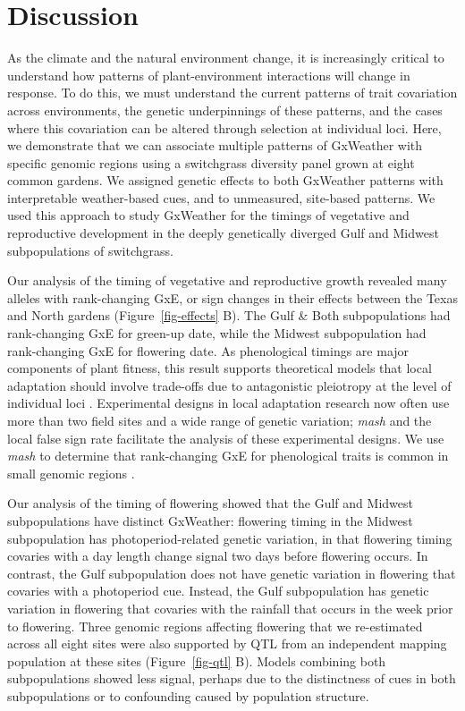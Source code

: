 \documentclass[
  9pt,
  twocolumn,
  twoside]{simple-article}%
\begin{document}
\section{Discussion}\label{discussion}

As the climate and the natural environment change, it is increasingly
critical to understand how patterns of plant-environment interactions
will change in response. To do this, we must understand the current
patterns of trait covariation across environments, the genetic
underpinnings of these patterns, and the cases where this covariation
can be altered through selection at individual loci. Here, we
demonstrate that we can associate multiple patterns of GxWeather with
specific genomic regions using a switchgrass diversity panel grown at
eight common gardens. We assigned genetic effects to both GxWeather
patterns with interpretable weather-based cues, and to unmeasured,
site-based patterns. We used this approach to study GxWeather for the
timings of vegetative and reproductive development in the deeply
genetically diverged Gulf and Midwest subpopulations of switchgrass.

Our analysis of the timing of vegetative and reproductive growth
revealed many alleles with rank-changing GxE, or sign changes in their
effects between the Texas and North gardens (Figure~\ref{fig-effects}
B). The Gulf \& Both subpopulations had rank-changing GxE for green-up
date, while the Midwest subpopulation had rank-changing GxE for
flowering date. As phenological timings are major components of plant
fitness, this result supports theoretical models that local adaptation
should involve trade-offs due to antagonistic pleiotropy at the level of
individual loci
\citep{kawecki2004conceptual, felsenstein1976theoretical, levene1953genetic, hedrick1986genetic}.
Experimental designs in local adaptation research now often use more
than two field sites and a wide range of genetic variation; \emph{mash}
and the local false sign rate facilitate the analysis of these
experimental designs. We use \emph{mash} to determine that rank-changing
GxE for phenological traits is common in small genomic regions
\citep{wadgymar2017identifying, savolainen2013ecological, lowry2019qtl}.

Our analysis of the timing of flowering showed that the Gulf and Midwest
subpopulations have distinct GxWeather: flowering timing in the Midwest
subpopulation has photoperiod-related genetic variation, in that
flowering timing covaries with a day length change signal two days
before flowering occurs. In contrast, the Gulf subpopulation does not
have genetic variation in flowering that covaries with a photoperiod
cue. Instead, the Gulf subpopulation has genetic variation in flowering
that covaries with the rainfall that occurs in the week prior to
flowering. Three genomic regions affecting flowering that we
re-estimated across all eight sites were also supported by QTL from an
independent mapping population at these sites (Figure~\ref{fig-qtl} B).
Models combining both subpopulations showed less signal, perhaps due to
the distinctness of cues in both subpopulations or to confounding caused
by population structure.
\end{document}
